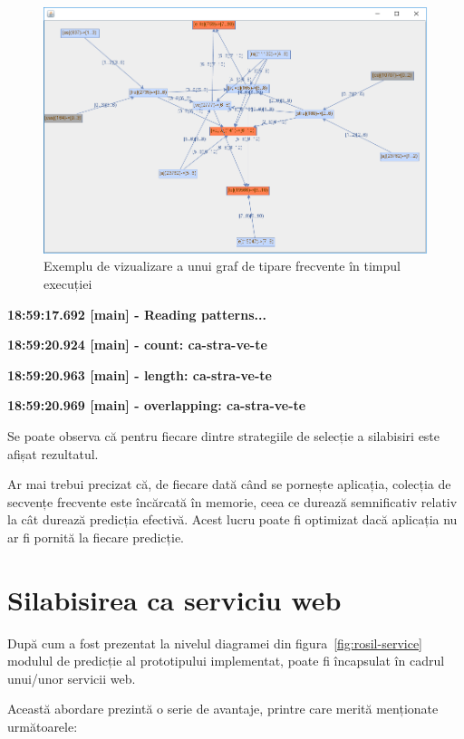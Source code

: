 \begin{figure}[h!]
    \centering
    \includegraphics[width=1.0\textwidth]{figures/rosil-castravete.png}
    \caption{Exemplu de vizualizare a unui graf de tipare frecvente în timpul execuției}
    \label{fig:rosil-graph}
\end{figure}


\textbf{18:59:17.692 [main] - Reading patterns...}

\textbf{18:59:20.924 [main] - count: ca-stra-ve-te}

\textbf{18:59:20.963 [main] - length: ca-stra-ve-te}

\textbf{18:59:20.969 [main] - overlapping: ca-stra-ve-te}

Se poate observa că pentru fiecare dintre strategiile de selecție a silabisiri este afișat rezultatul. 

Ar mai trebui precizat că, de fiecare dată când se pornește aplicația, colecția de secvențe frecvente este încărcată în memorie, ceea ce durează semnificativ relativ la cât durează predicția efectivă. Acest lucru poate fi optimizat dacă aplicația nu ar fi pornită la fiecare predicție.

\section{Silabisirea ca serviciu web}

După cum a fost prezentat la nivelul diagramei din figura~\ref{fig:rosil-service} modulul de predicție al prototipului implementat, poate fi încapsulat în cadrul unui/unor servicii web.

Această abordare prezintă o serie de avantaje, printre care merită menționate următoarele:

